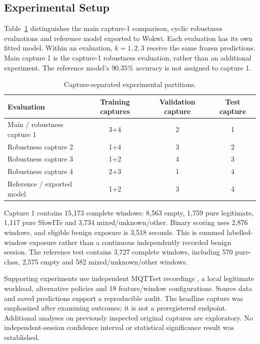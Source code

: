 \documentclass[conference]{IEEEtran}
\begin{document}
\subsection{Experimental Setup}

Table~\ref{tab:splits} distinguishes the main capture-1 comparison,
cyclic robustness evaluations and reference model exported to Wokwi.
Each evaluation has its own fitted model. Within an evaluation,
$k=1,2,3$ receive the same frozen predictions. Main capture 1 is the
capture-1 robustness evaluation, rather than an additional experiment.
The reference model's 90.35\% accuracy is not assigned to capture 1.

\begin{table}[t]
\centering
\caption{Capture-separated experimental partitions.}
\label{tab:splits}
\begin{tabularx}{\textwidth}{Xccc}
\toprule
Evaluation & Training captures & Validation capture & Test capture \\
\midrule
Main / robustness capture 1 & 3+4 & 2 & 1 \\
Robustness capture 2 & 1+4 & 3 & 2 \\
Robustness capture 3 & 1+2 & 4 & 3 \\
Robustness capture 4 & 2+3 & 1 & 4 \\
Reference / exported model & 1+2 & 3 & 4 \\
\bottomrule
\end{tabularx}
\end{table}

\begin{sloppypar}
Capture 1 contains 15,173 complete windows: 8,563 empty, 1,759 pure
legitimate, 1,117 pure SlowITe and 3,734 mixed/\allowbreak unknown/\allowbreak other. Binary
scoring uses 2,876 windows, and eligible benign exposure is 3,518
seconds. This is summed labelled-window exposure rather than a
continuous independently recorded benign session. The reference
test contains 3,727 complete windows, including 570 pure-class,
2,575 empty and 582 mixed/\allowbreak unknown/\allowbreak other windows.
\end{sloppypar}

Supporting experiments use independent MQTTset recordings
\cite{vaccari2020mqttset}, a local legitimate workload, alternative
policies and 18 feature/window configurations. Source data and saved
predictions support a reproducible audit. The headline capture was
emphasized after examining outcomes; it is not a preregistered endpoint.
Additional analyses on previously inspected original captures are
exploratory. No independent-session confidence interval or statistical
significance result was established.
\end{document}
